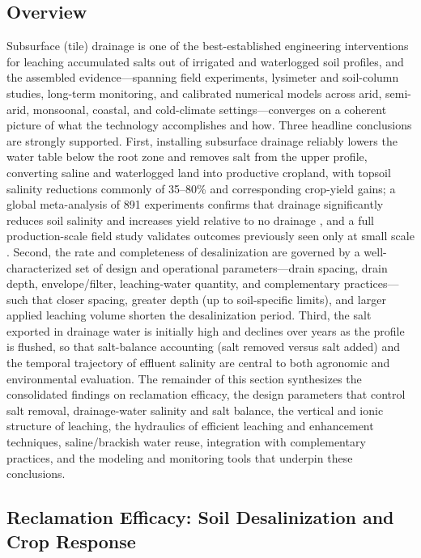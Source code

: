 \subsection{Overview}

Subsurface (tile) drainage is one of the best-established engineering interventions for leaching accumulated salts out of irrigated and waterlogged soil profiles, and the assembled evidence---spanning field experiments, lysimeter and soil-column studies, long-term monitoring, and calibrated numerical models across arid, semi-arid, monsoonal, coastal, and cold-climate settings---converges on a coherent picture of what the technology accomplishes and how. Three headline conclusions are strongly supported. First, installing subsurface drainage reliably lowers the water table below the root zone and removes salt from the upper profile, converting saline and waterlogged land into productive cropland, with topsoil salinity reductions commonly of 35--80\% and corresponding crop-yield gains; a global meta-analysis of 891 experiments confirms that drainage significantly reduces soil salinity and increases yield relative to no drainage \parencite{Yang2025}, and a full production-scale field study validates outcomes previously seen only at small scale \parencite{Derby2024}. Second, the rate and completeness of desalinization are governed by a well-characterized set of design and operational parameters---drain spacing, drain depth, envelope/filter, leaching-water quantity, and complementary practices---such that closer spacing, greater depth (up to soil-specific limits), and larger applied leaching volume shorten the desalinization period. Third, the salt exported in drainage water is initially high and declines over years as the profile is flushed, so that salt-balance accounting (salt removed versus salt added) and the temporal trajectory of effluent salinity are central to both agronomic and environmental evaluation. The remainder of this section synthesizes the consolidated findings on reclamation efficacy, the design parameters that control salt removal, drainage-water salinity and salt balance, the vertical and ionic structure of leaching, the hydraulics of efficient leaching and enhancement techniques, saline/brackish water reuse, integration with complementary practices, and the modeling and monitoring tools that underpin these conclusions.

\subsection{Reclamation Efficacy: Soil Desalinization and Crop Response}

